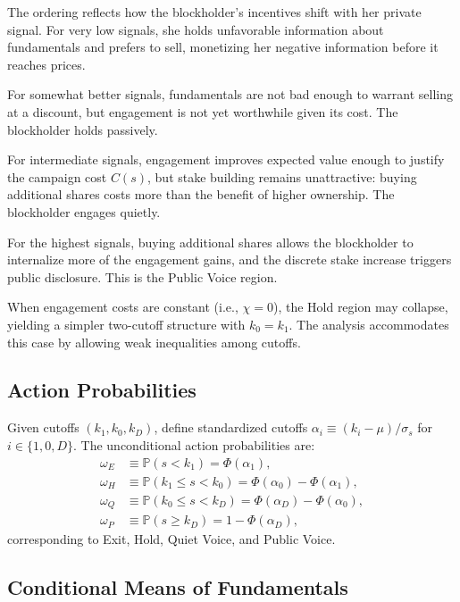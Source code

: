 \documentclass[11pt]{article}
\newcommand{\PP}{\mathbb{P}}
\newcommand{\1}{\mathbf{1}}
\begin{document}
The ordering reflects how the blockholder's incentives shift with her private signal. For very low signals, she holds unfavorable information about fundamentals and prefers to sell, monetizing her negative information before it reaches prices.

For somewhat better signals, fundamentals are not bad enough to warrant selling at a discount, but engagement is not yet worthwhile given its cost. The blockholder holds passively.

For intermediate signals, engagement improves expected value enough to justify the campaign cost $C(s)$, but stake building remains unattractive: buying additional shares costs more than the benefit of higher ownership. The blockholder engages quietly.

For the highest signals, buying additional shares allows the blockholder to internalize more of the engagement gains, and the discrete stake increase triggers public disclosure. This is the Public Voice region.

When engagement costs are constant (i.e., $\chi=0$), the Hold region may collapse, yielding a simpler two-cutoff structure with $k_0=k_1$. The analysis accommodates this case by allowing weak inequalities among cutoffs.

%
\subsection{Action Probabilities}
%

Given cutoffs $(k_1, k_0, k_D)$, define standardized cutoffs $\alpha_i \equiv (k_i - \mu)/\sigma_s$ for $i \in \{1, 0, D\}$. The unconditional action probabilities are:
\begin{align*}
\omega_E &\equiv \PP(s < k_1) = \Phi(\alpha_1), \\
\omega_H &\equiv \PP(k_1 \leq s < k_0) = \Phi(\alpha_0) - \Phi(\alpha_1), \\
\omega_Q &\equiv \PP(k_0 \leq s < k_D) = \Phi(\alpha_D) - \Phi(\alpha_0), \\
\omega_P &\equiv \PP(s \geq k_D) = 1 - \Phi(\alpha_D),
\end{align*}
corresponding to Exit, Hold, Quiet Voice, and Public Voice.

%
\subsection{Conditional Means of Fundamentals}
%
\end{document}
